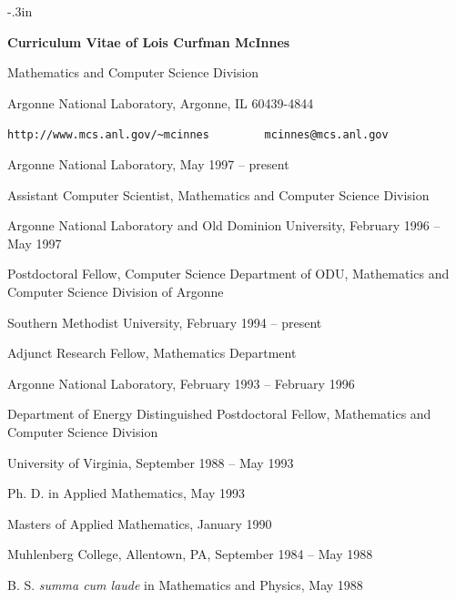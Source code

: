 
\newcommand{\itemskip}{\vspace*{12pt}}
\newcommand{\tinyskip}{\vspace*{2pt}}

\topmargin-.3in
\textwidth6.25in
\thispagestyle{empty}


{\large
\centerline{\large\bf Curriculum Vitae of Lois Curfman McInnes}
}
\centerline{Mathematics and Computer Science Division}
\centerline{Argonne National Laboratory,
Argonne, IL  60439-4844}
\centerline{{\tt http://www.mcs.anl.gov/\~{ }mcinnes} \ \ \ \ \ \ \ \ 
{\tt mcinnes@mcs.anl.gov}}

\itemskip
{}
\begin{description}
\item 
Argonne National Laboratory, May 1997 -- present
\begin{description}
\item
Assistant Computer Scientist, Mathematics and Computer Science Division
\end{description}
\item
Argonne National Laboratory and Old Dominion University, February 1996 -- May 1997
\begin{description}
\item
Postdoctoral Fellow, Computer Science Department of ODU, Mathematics and Computer Science Division of Argonne
\end{description}
\item
Southern Methodist University, February 1994 -- present
\begin{description}
\item
Adjunct Research Fellow, Mathematics Department
\end{description}
\item
Argonne National Laboratory, February 1993 -- February 1996
\begin{description}
\item
Department of Energy Distinguished Postdoctoral Fellow, Mathematics and Computer Science Division
\end{description}
\end{description}

\itemskip
{}
\begin{description}
\item
University of Virginia, September 1988 -- May 1993
\begin{description}
\item
Ph. D. in Applied Mathematics, May 1993
\item
Masters of Applied Mathematics, January 1990
\end{description}
\item
Muhlenberg College, Allentown, PA, September 1984 -- May 1988
\begin{description}
\item
B. S. {\it summa cum laude} in Mathematics and Physics, May 1988
\end{description}
\end{description}


